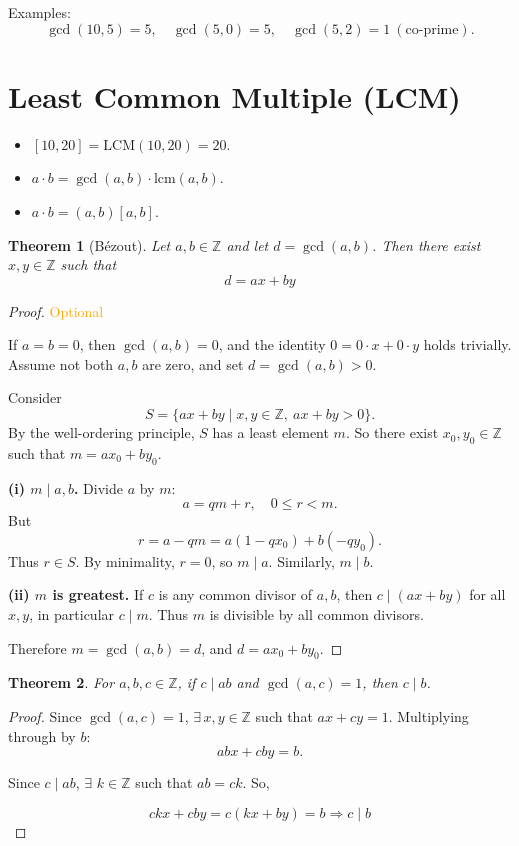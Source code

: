\documentclass[hidelinks]{article}
\theoremstyle{mystyle}
\newtheorem{theorem}{Theorem}[section]
\begin{document}
Examples:
\[
\gcd(10,5) = 5, \quad \gcd(5,0) = 5, \quad \gcd(5,2) = 1 \ (\text{co-prime}).
\]

\section{Least Common Multiple (LCM)}
\begin{itemize}
    \item $[10,20] = \mathrm{LCM}(10,20) = 20$.
    \item $a \cdot b = \gcd(a,b) \cdot \mathrm{lcm}(a,b)$.
    \item $a \cdot b = (a,b)[a,b]$.
\end{itemize}

\begin{theorem}[Bézout]
Let $a, b \in \mathbb{Z}$ and let $d = \gcd(a,b)$. Then there exist $x,y \in \mathbb{Z}$ such that
\[
d = ax + by
\]
\end{theorem}

\begin{proof}
\textcolor{orange}{Optional}

If $a=b=0$, then $\gcd(a,b)=0$, and the identity $0 = 0 \cdot x + 0 \cdot y$ holds trivially.  
Assume not both $a,b$ are zero, and set $d=\gcd(a,b)>0$.

Consider
\[
S = \{ax + by \mid x,y \in \mathbb{Z},\ ax+by>0\}.
\]
By the well-ordering principle, $S$ has a least element $m$.  
So there exist $x_0,y_0 \in \mathbb{Z}$ such that $m=ax_0+by_0$.

\textbf{(i) $m \mid a,b$.}  
Divide $a$ by $m$:
\[
a = qm + r, \quad 0 \leq r < m.
\]
But
\[
r = a - qm = a(1-qx_0) + b(-qy_0).
\]
Thus $r \in S$. By minimality, $r=0$, so $m \mid a$. Similarly, $m \mid b$.

\textbf{(ii) $m$ is greatest.}  
If $c$ is any common divisor of $a,b$, then $c \mid (ax+by)$ for all $x,y$, in particular $c \mid m$.  
Thus $m$ is divisible by all common divisors.

Therefore $m = \gcd(a,b) = d$, and $d = ax_0 + by_0$.

\end{proof}


\begin{theorem}
For $a,b,c \in \mathbb{Z}$, if $c \mid ab$ and $\gcd(a,c)=1$, then $c \mid b$.
\end{theorem}

\begin{proof}
Since $\gcd(a,c)=1$, $\exists \, x,y \in \mathbb{Z}$ such that $ax+cy=1$.  
Multiplying through by $b$:
\[
abx + cby = b.
\]

Since $c \mid ab$, $\exists$ $k \in \mathbb{Z}$ such that $ab = ck$. So,

$$ckx + cby = c(kx + by) = b \Rightarrow c \mid b$$

\end{proof}
\end{document}
